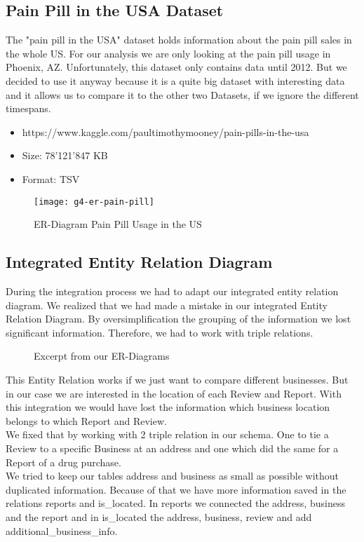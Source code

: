 \subsection*{Pain Pill in the USA Dataset}
The "pain pill in the USA" dataset holds information about the pain pill sales in the whole US. For our analysis we are only looking at the pain pill usage in Phoenix, AZ.
Unfortunately, this dataset only contains data until 2012. But we decided to use it anyway because it is a quite big dataset with interesting data and it allows us to compare it to the other two Datasets, if we ignore the different timespans.
\begin{itemize}
	\item https://www.kaggle.com/paultimothymooney/pain-pills-in-the-usa
	\item Size: 78'121'847 KB
	\item Format: TSV
\end{itemize}
\begin{figure}[H]
    \centering
    \texttt{[image: g4-er-pain-pill]}
    \caption{ER-Diagram Pain Pill Usage in the US}
    \label{fig:pillER}
\end{figure}

\subsection*{Integrated Entity Relation Diagram}
During the integration process we had to adapt our integrated entity relation diagram.
We realized that we had made a mistake in our integrated Entity Relation Diagram.
By oversimplification the grouping of the information we lost significant information. Therefore, we had to work with triple relations.
\begin{figure}[H]
    \centering
        \qquad
    \caption{Excerpt from our ER-Diagrams}
    \label{fig:erv1v2}
\end{figure}
This Entity Relation works if we just want to compare different businesses. But in our case we are interested in the location of each Review and Report. With this integration we would have lost the information which business location belongs to which Report and Review.\\
We fixed that by working with 2 triple relation in our schema. One to tie a Review to a specific Business at an address and one which did the same for a Report of a drug purchase.\\
We tried to keep our tables address and business as small as possible without duplicated information. Because of that we have more information saved in the relations reports and is\_located. In reports we connected the address, business and the report and in is\_located the address, business, review and add additional\_business\_info.\\

